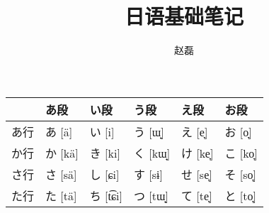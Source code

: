 \documentclass[a4paper]{ctexart}
\title{日语基础笔记}
\author{赵磊}
\makeatletter
\def\arraycentercr{\let\newline\@centercr}
\newcommand{\ipa}[1]{\footnotesize[{\ipafont#1}]}
\makeatother
\begin{document}
\maketitle

\section{}

\begin{table}[H]
  \centering
  \renewcommand{\tabularxcolumn}[1]{
    >{\centering\arraybackslash\arraycentercr}m{#1}}
  \begin{tabularx}{4in}{c*{5}{|X}}
      & あ段
      & い段
      & う段
      & え段
      & お段 \\
    \hline
    あ行
      & あ \newline \ipa{ä}
      & い \newline \ipa{i}
      & う \newline \ipa{ɯ̟}
      & え \newline \ipa{e̞}
      & お \newline \ipa{o̞} \\
    \hline
    か行
      & か \newline \ipa{kä}
      & き \newline \ipa{ki}
      & く \newline \ipa{kɯ̟}
      & け \newline \ipa{ke̞}
      & こ \newline \ipa{ko̞} \\
    \hline
    さ行
      & さ \newline \ipa{sä}
      & し \newline \ipa{ɕi}
      & す \newline \ipa{sɨ}
      & せ \newline \ipa{se̞}
      & そ \newline \ipa{so̞} \\
    \hline
    た行
      & た \newline \ipa{tä}
      & ち \newline \ipa{t͡ɕi}
      & つ \newline \ipa{tɯ̟}
      & て \newline \ipa{te̞}
      & と \newline \ipa{to̞} \\

\end{tabularx}
\end{table}
\end{document}
